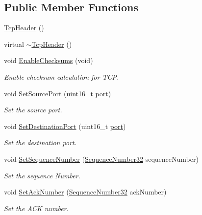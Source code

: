 \subsection*{Public Member Functions}
\begin{DoxyCompactItemize}
\item 
\hyperlink{classns3_1_1TcpHeader_a883249d2736c8d90ed0c097abbad2cf7}{Tcp\+Header} ()
\item 
virtual \hyperlink{classns3_1_1TcpHeader_afcad92ffa295c51d8c10a9f68af0e580}{$\sim$\+Tcp\+Header} ()
\item 
void \hyperlink{classns3_1_1TcpHeader_adee6d50bbaaec31bd22e29a5cbf93ef8}{Enable\+Checksums} (void)
\begin{DoxyCompactList}\small\item\em Enable checksum calculation for T\+CP. \end{DoxyCompactList}\item 
void \hyperlink{classns3_1_1TcpHeader_aceb2630b3d43118ee576aec58f55a0ff}{Set\+Source\+Port} (uint16\+\_\+t \hyperlink{visualizer-ideas_8txt_a21ff1c530daf8435e00048b7fc2c58e3}{port})
\begin{DoxyCompactList}\small\item\em Set the source port. \end{DoxyCompactList}\item 
void \hyperlink{classns3_1_1TcpHeader_a3259c06373ba4261eaaaed0cbf40cad3}{Set\+Destination\+Port} (uint16\+\_\+t \hyperlink{visualizer-ideas_8txt_a21ff1c530daf8435e00048b7fc2c58e3}{port})
\begin{DoxyCompactList}\small\item\em Set the destination port. \end{DoxyCompactList}\item 
void \hyperlink{classns3_1_1TcpHeader_a3483eb1604d7db47b1163b02f74bcc25}{Set\+Sequence\+Number} (\hyperlink{group__network_gacb2070e4e98d2d5135c9bede58f07a03}{Sequence\+Number32} sequence\+Number)
\begin{DoxyCompactList}\small\item\em Set the sequence Number. \end{DoxyCompactList}\item 
void \hyperlink{classns3_1_1TcpHeader_ad594a427a382dc395261a94749e1878c}{Set\+Ack\+Number} (\hyperlink{group__network_gacb2070e4e98d2d5135c9bede58f07a03}{Sequence\+Number32} ack\+Number)
\begin{DoxyCompactList}\small\item\em Set the A\+CK number. \end{DoxyCompactList}\item 

\end{DoxyCompactItemize}
